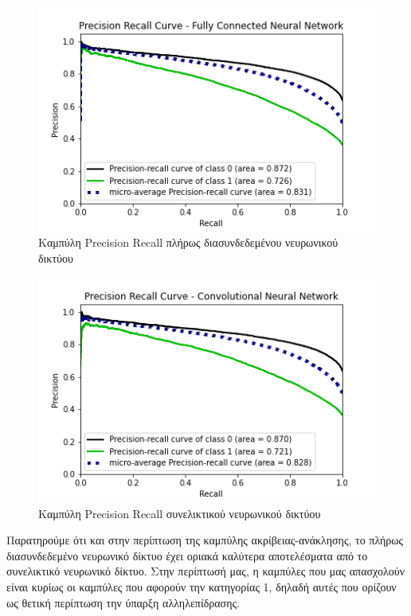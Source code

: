 \begin{figure}[H]
  \centering
  \includegraphics[width=1\textwidth]{images/DNNPRC.png}
  \caption{Καμπύλη Precision Recall πλήρως διασυνδεδεμένου νευρωνικού δικτύου}
  \label{fig:DNNPRC}
\end{figure}

\begin{figure}[H]
  \centering
  \includegraphics[width=1\textwidth]{images/CNNPRC.png}
  \caption{Καμπύλη Precision Recall συνελικτικού νευρωνικού δικτύου}
  \label{fig:CNNPRC}
\end{figure}
Παρατηρούμε ότι και στην περίπτωση της καμπύλης ακρίβειας-ανάκλησης, το πλήρως διασυνδεδεμένο νευρωνικό δίκτυο έχει οριακά καλύτερα αποτελέσματα από το συνελικτικό νευρωνικό δίκτυο. Στην περίπτωσή μας, η καμπύλες που μας απασχολούν είναι κυρίως οι καμπύλες που αφορούν την κατηγορίας 1, δηλαδή αυτές που ορίζουν ως θετική περίπτωση την ύπαρξη αλληλεπίδρασης. 

